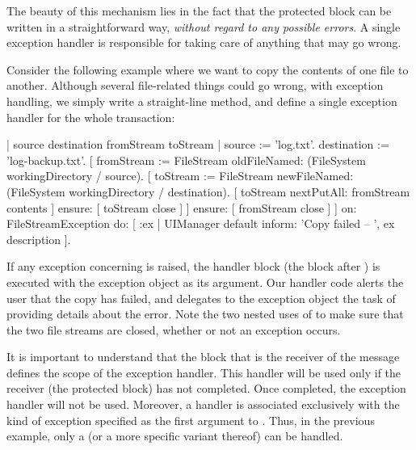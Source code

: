 

The beauty of this mechanism lies in the fact that the protected block can be written in  a straightforward way, \emph{without regard to any possible errors}. A single exception handler is responsible for taking care of anything that may go wrong.

Consider the following example where we want to copy the contents of one file to another.
Although several file-related things could go wrong, with exception handling, we simply write a straight-line method, and define a single exception handler for the whole transaction: 
\begin{code}{}
| source destination fromStream toStream |
source := 'log.txt'.
destination := 'log-backup.txt'.
[ fromStream := FileStream oldFileNamed: (FileSystem workingDirectory / source).
	[ toStream := FileStream newFileNamed: (FileSystem workingDirectory / destination). 
		[ toStream nextPutAll: fromStream contents ]
			ensure: [ toStream close ] ]
		ensure: [ fromStream close ] ]
	on: FileStreamException
	do: [ :ex | UIManager default inform: 'Copy failed -- ', ex description ].
\end{code}

If any exception concerning  is raised, the handler block (the block after ) is executed with the exception object as its argument.
Our handler code alerts the user that the copy has failed, and delegates to the exception object  the task of providing details about the error.
Note the two nested uses of  to make sure that the two file streams are closed, whether or not an exception occurs.

It is important to understand  that the block that is the receiver of the message  defines the scope of the exception handler. This handler will be used only if the receiver (\ie the protected block) has not completed. Once completed, the exception handler will not be used. Moreover, a handler is associated exclusively with the kind of exception specified as the first argument to . 
Thus, in the previous example, only a  (or a more specific variant thereof) can be handled.


